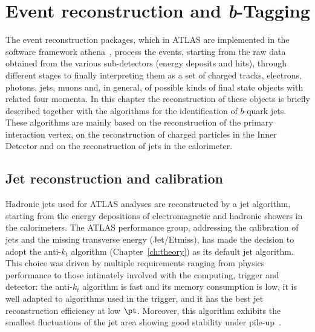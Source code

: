 %
%

\chapter{Event reconstruction and \emph{\textbf{b}}-Tagging }\label{ch:reco}


The event reconstruction packages, which in ATLAS are implemented in the software framework {\sc athena}~\cite{Calafiura2005zz}, process the events, starting from the raw data obtained from the various sub-detectors (energy deposits and hits),  %
through different stages to finally interpreting them as a set of charged tracks, electrons, photons, jets, muons and, in general, of possible kinds of final state objects with related four momenta.  
In this chapter the reconstruction of these objects is briefly described together with the algorithms for the identification of $b$-quark jets.  These algorithms are mainly based on the reconstruction of the primary interaction vertex, on the reconstruction of charged particles in the Inner Detector and on the reconstruction of jets in the calorimeter.   

\section{Jet reconstruction and calibration}\label{sec:jetcalib}

Hadronic jets used for ATLAS analyses are reconstructed by a jet algorithm, starting from the energy depositions of electromagnetic and hadronic showers in the calorimeters. 
The ATLAS performance group, addressing the calibration of jets and the missing transverse energy (Jet/Etmiss), has made the decision to adopt the anti-$k_t$ algorithm (Chapter~\ref{ch:theory}) as its default jet algorithm. This choice was driven by multiple requirements ranging from physics performance to those intimately involved with the computing, trigger and detector: the anti-$k_t$ algorithm is fast and its memory consumption is low, it is well adapted to algorithms used in the trigger, and it has the best jet reconstruction efficiency at low $\pt$. Moreover, this algorithm exhibits the smallest fluctuations of the jet area showing good stability under pile-up~\cite{Asquith:1311867}.

